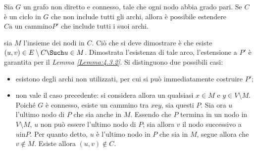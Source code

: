 \documentclass{subfiles}
\begin{document}
\begin{Theorem}
\begin{Proof*}
        \begin{Lemma}
            Sia \(G\) un grafo non diretto e connesso, tale che ogni nodo abbia grado pari.
            Se \(C\) è un ciclo in \(G\) che non include tutti gli archi, allora è possibile estendere \(C \text{a un cammino} P'\) che include tutti i suoi archi.

            \begin{Proof*}
                sia \(M\) l'insieme dei nodi in \(C\). Ciò che si deve dimostrare è che esiste \((u, v) \in E \setminus C \Such u \in M\).
                Dimostrata l'esistenza di tale arco, l'estensione a \(P'\) è garantita per il \emph{Lemma \ref{Lemma:4.3.2}}.
                Si distinguono due possibili casi:
                \begin{itemize}
                    \item esistono degli archi non utilizzati, per cui si può immediatamente costruire \(P'\);

                    \item non vale il caso precedente: si considera allora un qualsiasi \(x \in M\) e \(y \in V \setminus M\).
                          Poiché \(G\) è connesso, esiste un cammino tra \(x \text{e} y\), sia questi \(P\).
                          Sia ora \(u\) l'ultimo nodo di \(P\) che sia anche in \(M\). Essendo che \(P\) termina in un nodo in \(V \setminus M\),
                          \(u\) non può essere l'ultimo nodo di \(P\); sia allora \(v\) il nodo successivo a \(u \text{in} P\).
                          Per quanto detto, \(u\) è l'ultimo nodo in \(P\) che sia in \(M\), segue allora che \(v \notin M\).
                          Esiste allora \((u,v) \notin C\).
                \end{itemize}
            \end{Proof*}
        \end{Lemma}
    \end{Proof*}
\end{Theorem}
\end{document}
